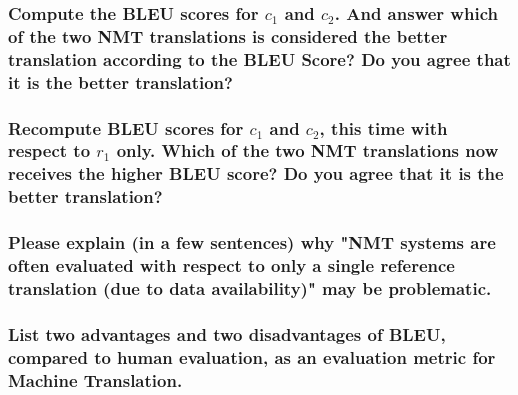 \documentclass[12pt, letterpaper]{article}
\begin{document}
\subsubsection{Compute the BLEU scores for $c_1$ and $c_2$. And answer which of the two NMT translations is considered the better translation according to the BLEU Score? Do you agree that it is the better translation?}

\subsubsection{Recompute BLEU scores for $c_1$ and $c_2$, this time with respect to $r_1$ only. Which of the two NMT translations now receives the higher BLEU score? Do you agree that it is the better translation?}

\subsubsection{Please explain (in a few sentences) why "NMT systems are often evaluated with respect to only a single reference translation (due to data availability)" may be problematic.}

\subsubsection{List two advantages and two disadvantages of BLEU, compared to human evaluation, as an evaluation metric for Machine Translation.}
\end{document}
